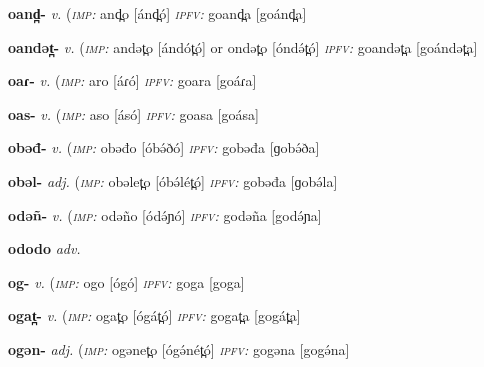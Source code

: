 {\newentry
\headword\textbf{oand̪-}  
\ipa{[oánd̪-]}
\synpos\textit{v.} 
\imperative(\textit {\textsc{imp:}} and̪o [ánd̪ó]
\imperfective\textit{\textsc{ipfv:}} goand̪a [goánd̪a] %

\newentry
\headword\textbf{oandət̪-}  
\ipa{[oándət̪-]}
\synpos\textit{v.} 
\imperative(\textit {\textsc{imp:}} andət̪o [ándót̪ó] or ondət̪o [óndə́t̪ó]
\imperfective\textit{\textsc{ipfv:}} goandət̪a [goándət̪a] %

\newentry
\headword\textbf{oaɾ-}  
\ipa{[oáɾ-]}
\synpos\textit{v.} 
\imperative(\textit {\textsc{imp:}} aro [áɾó] 
\imperfective\textit{\textsc{ipfv:}} goara [goáɾa] %

\newentry
\headword\textbf{oas-}  
\ipa{[oás-]}
\synpos\textit{v.} 
\imperative(\textit {\textsc{imp:}} aso [ásó] 
\imperfective\textit{\textsc{ipfv:}} goasa [goása] %


\newentry
\headword\textbf{obəđ-}  
\ipa{[obə́ð-]}
\synpos\textit{v.} 
\imperative(\textit {\textsc{imp:}} obəđo [óbə́ðó]
\imperfective\textit{\textsc{ipfv:}} gobəđa [ɡobə́ða] 

\newentry
\headword\textbf{obəl-}  
\ipa{[obə́l-]}
\synpos\textit{adj.} 
\imperative(\textit {\textsc{imp:}} obəlet̪o [óbə́lét̪ó]
\imperfective\textit{\textsc{ipfv:}} gobəđa [ɡobə́la] %

\newentry
\headword\textbf{odəñ-}  
\ipa{[odə́ɲ-]}
\synpos\textit{v.} 
\imperative(\textit {\textsc{imp:}} odəño [ódə́ɲó]
\imperfective\textit{\textsc{ipfv:}} godəña [godə́ɲa] 

\newentry
\headword\textbf{ododo}  
\ipa{[ododo]}
\synpos\textit{adv.} 

\newentry
\headword\textbf{og-}  
\ipa{[og-]}
\synpos\textit{v.} 
\imperative(\textit {\textsc{imp:}} ogo [ógó]
\imperfective\textit{\textsc{ipfv:}} goga [goga] 

\newentry
\headword\textbf{ogat̪-}  
\ipa{[ogát̪-]}
\synpos\textit{v.} 
\imperative(\textit {\textsc{imp:}} ogat̪o [ógát̪ó]
\imperfective\textit{\textsc{ipfv:}} gogat̪a [gogát̪a] 

\newentry
\headword\textbf{ogən-}  
\ipa{[ogə́n-]}
\synpos\textit{adj.} 
\imperative(\textit {\textsc{imp:}} ogənet̪o [ógə́nét̪ó]
\imperfective\textit{\textsc{ipfv:}} gogəna [gogə́na] 

}
